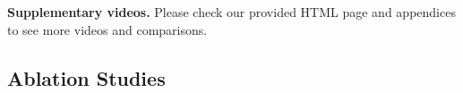 \ifdefined\arxivbuild\else\documentclass{article}\fi %
\def\authornote#1#2#3{{\textcolor{#2}{\textsl{\small#1:[*#3*]}}}}
\newcommand{\son}[1]{\authornote{Son}{red}{#1}}
\begin{document}
\noindent\textbf{Supplementary videos.} Please check our provided HTML page and appendices to see more videos and comparisons.









\subsection{Ablation Studies}
\label{sec:ablation}
\end{document}
